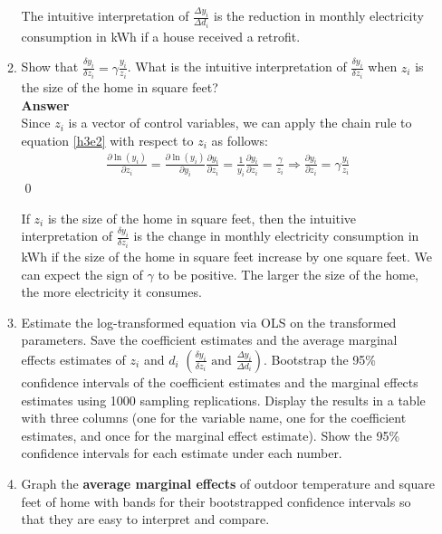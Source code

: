 \documentclass{article}
\begin{document}
\begin{enumerate}
\begin{enumerate}
    The intuitive interpretation of $\frac{\Delta y_i}{\Delta d_i}$ is the reduction in monthly electricity consumption in kWh if a house received a retrofit.
    \item Show that $\frac{\delta y_i}{\delta z_i}=\gamma\frac{y_i}{z_i}$. What is the intuitive interpretation of $\frac{\delta y_i}{\delta z_i}$ when $z_i$ is the size of the home in square feet?
    \\\textbf{Answer}\\
    Since $z_i$ is a vector of control variables, we can apply the chain rule to equation \eqref{h3e2} with respect to $z_i$ as follows:
    \begin{align}
        \frac{\partial \ln(y_i)}{\partial z_i}=\frac{\partial \ln(y_i)}{\partial y_i}\frac{\partial y_i}{\partial z_i}=\frac{1}{y_i}\frac{\partial y_i}{\partial z_i}=\frac{\gamma}{z_i}\Rightarrow \frac{\partial y_i}{\partial z_i}=\gamma\frac{y_i}{z_i} \label{h3e8}
    \end{align}\qed

    If $z_i$ is the size of the home in square feet, then the intuitive interpretation of $\frac{\delta y_i}{\delta z_i}$ is the change in monthly electricity consumption in kWh if the size of the home in square feet increase by one square feet. We can expect the sign of $\gamma$ to be positive. The larger the size of the home, the more electricity it consumes.

    \item Estimate the log-transformed equation via OLS on the transformed parameters. Save the coefficient estimates and the average marginal effects estimates of $z_i$ and $d_i$ $\left(\frac{\delta y_i}{\delta z_i}\text{ and }\frac{\Delta y_i}{\Delta d_i}\right)$. Bootstrap the 95\% confidence intervals of the coefficient estimates and the marginal effects estimates using 1000 sampling replications. Display the results in a table with three columns (one for the variable name, one for the coefficient estimates, and once for the marginal effect estimate). Show the 95\% confidence intervals for each estimate under each number.
    \item Graph the \textbf{average marginal effects} of outdoor temperature and square feet of home with bands for their bootstrapped confidence intervals so that they are easy to interpret and compare.
\end{enumerate}


\end{enumerate}
\end{document}
